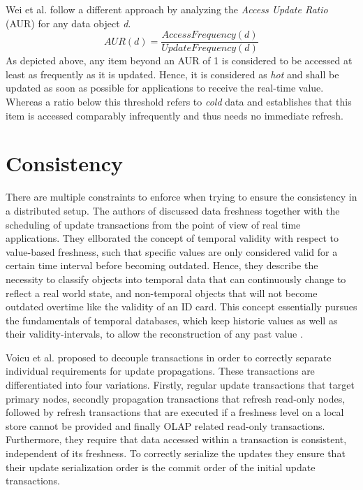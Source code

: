 Wei et al. \cite{wei:2004} follow a different approach by analyzing the \emph{Access Update Ratio} (AUR) for any data object \textit{d}. 
\begin{equation}
AUR(d) = \frac{AccessFrequency(d)}{UpdateFrequency(d)}
\end{equation}
As depicted above, any item beyond an AUR of 1 is considered to be accessed at least as frequently as it is updated.
Hence, it is considered as \emph{hot} and shall be updated as soon as possible for applications to receive the real-time value. 
Whereas a ratio below this threshold refers to \emph{cold} data and establishes that this item is accessed comparably infrequently and thus needs no immediate refresh. 






\section{Consistency}
\label{sec:consistency}
There are multiple constraints to enforce when trying to ensure the consistency in a distributed setup.
The authors of \cite{wei:2004, xiang:2008} discussed data freshness together with the scheduling of update transactions from the 
point of view of real time applications. They ellborated the concept of temporal validity with respect to value-based freshness,
such that specific values are only considered valid for a certain time interval before becoming outdated. Hence, they describe the necessity to classify objects into
temporal data that can continuously change to reflect a real world state, and non-temporal objects that will not become outdated overtime like the validity of an ID card.
This concept essentially pursues the fundamentals of temporal databases, which keep historic values as well as their validity-intervals, to allow the reconstruction of any 
past value \cite{etzion:1998}. 

Voicu et al. \cite{voicu:2010} proposed to decouple transactions in order to correctly separate individual requirements for update propagations.
These transactions are differentiated into four variations. Firstly, regular update transactions that target primary nodes, secondly propagation transactions 
that refresh read-only nodes, followed by refresh transactions that are executed if a freshness level on a local store cannot be provided and 
finally OLAP related read-only transactions.
Furthermore, they require that data accessed within a transaction is consistent, independent of its freshness. To correctly serialize the updates
they ensure that their update serialization order is the commit order of the initial update transactions.\\

